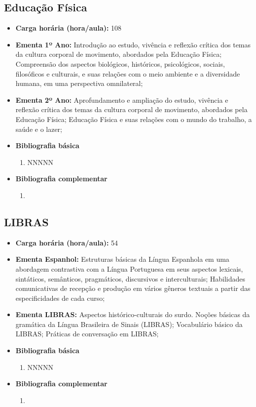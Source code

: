 \documentclass[11pt,fleqn]{book} %
\begin{document}
\subsection{Educação Física}\label{disc:educacaofisica}
\begin{itemize}
	\item \textbf{Carga horária (hora/aula):} 108
	\item \textbf{Ementa 1º Ano:} 
	Introdução ao estudo, vivência e reflexão crítica dos temas da cultura corporal de movimento, abordados pela Educação Física;
	Compreensão dos aspectos biológicos, históricos, psicológicos, sociais, filosóficos e culturais, e suas relações com o meio ambiente e a diversidade humana, em uma perspectiva omnilateral;
	
	\item \textbf{Ementa 2º Ano:} 
	Aprofundamento e ampliação do estudo, vivência e reflexão crítica dos temas da cultura corporal de movimento, abordados pela Educação Física;
	Educação Física e suas relações com o mundo do trabalho, a saúde e o lazer;	
	\item \textbf{Bibliografia básica}
	\begin{enumerate}
		\item NNNNN
	\end{enumerate}
	\item \textbf{Bibliografia complementar}
	\begin{enumerate}
		\item 
	\end{enumerate}	
\end{itemize}

\newpage
\subsection{LIBRAS}\label{disc:libras}
\begin{itemize}
	\item \textbf{Carga horária (hora/aula):} 54
	\item \textbf{Ementa Espanhol:} 
	Estruturas básicas da Língua Espanhola em uma abordagem contrastiva com a Língua Portuguesa em seus aspectos lexicais, sintáticos, semânticos, pragmáticos, discursivos e interculturais; 
	Habilidades comunicativas de recepção e produção em vários gêneros textuais a partir das especificidades de cada curso;
	\item \textbf{Ementa LIBRAS:}
	Aspectos histórico-culturais do surdo. Noções básicas da gramática da Língua Brasileira de Sinais (LIBRAS);
	Vocabulário básico da LIBRAS;
	Práticas de conversação em LIBRAS;		
	\item \textbf{Bibliografia básica}
	\begin{enumerate}
		\item NNNNN
	\end{enumerate}
	\item \textbf{Bibliografia complementar}
	\begin{enumerate}
		\item 
	\end{enumerate}	
\end{itemize}
\end{document}
